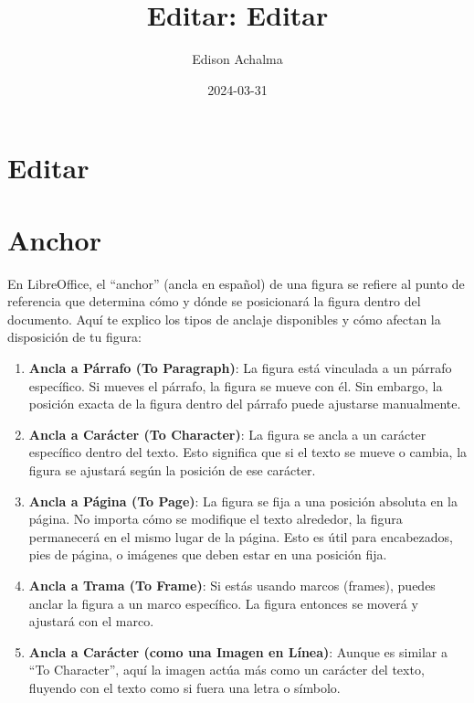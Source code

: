 \documentclass[
  jou,
  floatsintext,
  longtable,
  a4paper,
  nolmodern,
  notxfonts,
  notimes,
  colorlinks=true,linkcolor=blue,citecolor=blue,urlcolor=blue]{apa7}
\title{Editar: Editar}
\author{Edison Achalma}
\affiliation{
{Escuela Profesional de Economía, Universidad Nacional de San Cristóbal
de Huamanga}}
\date{2024-03-31}
\begin{document}
\maketitle

\hypertarget{toc}{}
\tableofcontents
\newpage
\section[Introduction]{Editar}

\setcounter{secnumdepth}{5}

\setlength\LTleft{0pt}


\section{Anchor}\label{anchor}

En LibreOffice, el ``anchor'' (ancla en español) de una figura se
refiere al punto de referencia que determina cómo y dónde se posicionará
la figura dentro del documento. Aquí te explico los tipos de anclaje
disponibles y cómo afectan la disposición de tu figura:

\begin{enumerate}
\def\labelenumi{\arabic{enumi}.}
\item
  \textbf{Ancla a Párrafo (To Paragraph)}: La figura está vinculada a un
  párrafo específico. Si mueves el párrafo, la figura se mueve con él.
  Sin embargo, la posición exacta de la figura dentro del párrafo puede
  ajustarse manualmente.
\item
  \textbf{Ancla a Carácter (To Character)}: La figura se ancla a un
  carácter específico dentro del texto. Esto significa que si el texto
  se mueve o cambia, la figura se ajustará según la posición de ese
  carácter.
\item
  \textbf{Ancla a Página (To Page)}: La figura se fija a una posición
  absoluta en la página. No importa cómo se modifique el texto
  alrededor, la figura permanecerá en el mismo lugar de la página. Esto
  es útil para encabezados, pies de página, o imágenes que deben estar
  en una posición fija.
\item
  \textbf{Ancla a Trama (To Frame)}: Si estás usando marcos (frames),
  puedes anclar la figura a un marco específico. La figura entonces se
  moverá y ajustará con el marco.
\item
  \textbf{Ancla a Carácter (como una Imagen en Línea)}: Aunque es
  similar a ``To Character'', aquí la imagen actúa más como un carácter
  del texto, fluyendo con el texto como si fuera una letra o símbolo.
\end{enumerate}
\end{document}

